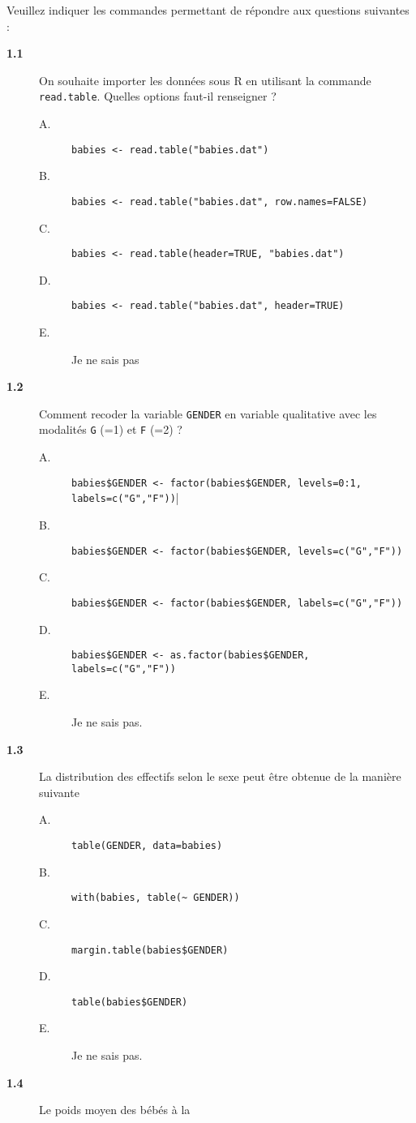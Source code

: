 \documentclass[11pt]{report}
\theoremstyle{definition}
\begin{document}
Veuillez indiquer les commandes permettant de répondre aux questions suivantes :
\begin{description}
\item[\bf 1.1]  On souhaite importer les données
  sous R en utilisant la commande \texttt{read.table}. Quelles options
  faut-il renseigner ?
  \begin{description}
  \item[A.] \verb|babies <- read.table("babies.dat")|
  \item[B.] \verb|babies <- read.table("babies.dat", row.names=FALSE)|
  \item[C.] \verb|babies <- read.table(header=TRUE, "babies.dat")|
  \item[D.] \verb|babies <- read.table("babies.dat", header=TRUE)|
  \item[E.] Je ne sais pas
  \end{description}
\item[\bf 1.2]  Comment recoder la variable
  \texttt{GENDER} en variable qualitative avec les modalités \texttt{G} (=1)
  et \texttt{F} (=2) ?
  \begin{description}
  \item[A.] \verb|babies$GENDER <- factor(babies$GENDER, levels=0:1, labels=c("G","F"))||
  \item[B.] \verb|babies$GENDER <- factor(babies$GENDER, levels=c("G","F"))|
  \item[C.] \verb|babies$GENDER <- factor(babies$GENDER, labels=c("G","F"))|
  \item[D.] \verb|babies$GENDER <- as.factor(babies$GENDER, labels=c("G","F"))|
  \item[E.] Je ne sais pas.
  \end{description}
\item[\bf 1.3]  La distribution des effectifs selon
  le sexe peut être obtenue de la manière suivante
  \begin{description}
  \item[A.] \verb|table(GENDER, data=babies)|
  \item[B.] \verb|with(babies, table(~ GENDER))|
  \item[C.] \verb|margin.table(babies$GENDER)|
  \item[D.] \verb|table(babies$GENDER)|
  \item[E.] Je ne sais pas.
  \end{description}  
\item[\bf 1.4]  Le poids moyen des bébés à la

\end{description}
\end{document}
